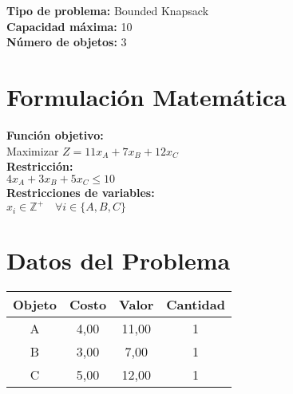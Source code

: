 \documentclass{article}
\begin{document}
\thispagestyle{empty}
\newpage
\textbf{Tipo de problema:} Bounded Knapsack\\
\textbf{Capacidad máxima:} 10\\
\textbf{Número de objetos:} 3\\

\section*{Formulación Matemática}
\textbf{Función objetivo:}\\
Maximizar $Z = 11 x_{A} + 7 x_{B} + 12 x_{C}$\\

\textbf{Restricción:}\\
$4 x_{A} + 3 x_{B} + 5 x_{C} \leq 10$\\

\textbf{Restricciones de variables:}\\
$x_i \in \mathbb{Z}^+ \quad \forall i \in \{A, B, C\}$\\
\vspace{0.5cm}

\section*{Datos del Problema}
\begin{tabular}{|c|c|c|c|}
\hline
Objeto & Costo & Valor & Cantidad \\
\hline
A & 4,00 & 11,00 & 1 \\
B & 3,00 & 7,00 & 1 \\
C & 5,00 & 12,00 & 1 \\
\hline
\end{tabular}
\end{document}
